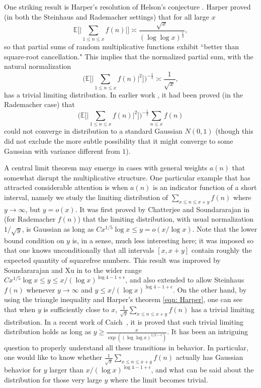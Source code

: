\documentclass[12pt, notitlepage]{amsart}
\numberwithin{equation}{section}
\def\E{\mathbb E}
\theoremstyle{remark}
\theoremstyle{definition}
\theoremstyle{remark}
\numberwithin{equation}{section}
\begin{document}
One striking result is Harper's resolution \cite{HarperLow} of Helson's conjecture \cite{Helson}.  Harper proved (in both the Steinhaus and Rademacher settings) that for all large $x$
 \begin{equation}\label{eqn: Harper}
  \E\Big[\Big|\sum_{1\le n \le x} f(n)\Big|\Big] \asymp \frac{\sqrt{x}}{(\log \log x)^{\frac 14}}, 
 \end{equation}
 so that partial sums of random multiplicative functions exhibit ``better than square-root cancellation."   This implies that the normalized partial sum, with the natural normalization 
 $$
 \Big(\E\Big[\Big|\sum_{1\le n \le x} f(n)\Big|^2\Big]\Big)^{-\frac 12}  \asymp \frac{1}{\sqrt{x}}, 
 $$
 has a trivial limiting distribution. In earlier work \cite{Harper}, it had been proved (in the Rademacher case) that 
 $$ 
 \Big(\E\Big[\Big|\sum_{1\le n \le x} f(n)\Big|^2\Big] \Big)^{-\frac 12} \sum_{n \leq x} f(n)
 $$ 
 could not converge in distribution to a standard Gaussian $N(0,1)$ (though this did not exclude the more subtle possibility that it might converge to some Gaussian with variance different from $1$).

 A central limit theorem may emerge in cases with general weights $a(n)$ that somewhat disrupt the multiplicative structure.  One particular example that has attracted considerable attention is when $a(n)$ is an indicator function of a short interval, namely we study the limiting distribution of $\sum_{x\le n \le x+y}f(n)$ where $y \rightarrow \infty$, but $y=o(x)$. It was first proved by Chatterjee and Soundararajan in \cite{CS} (for Rademacher $f(n)$) that the limiting distribution, with usual normalization $1/\sqrt
 {y}$, is Gaussian as long as $Cx^{1/5} \log x \leq y = o(x/\log x)$. Note that the lower bound condition on $y$ is, in a sense, much less interesting here; it was imposed so that one knows unconditionally that all intervals $[x, x+y]$ contain roughly the expected quantity of squarefree numbers. This result was improved by Soundararajan and Xu in \cite{SoundXu} to the wider range $Cx^{1/5} \log x \leq y\le x/(\log x)^{\log4-1 + \epsilon}$, and also extended to allow Steinhaus $f(n)$ whenever $y \rightarrow \infty$ and $y\le x/(\log x)^{\log4-1 + \epsilon}$. On the other hand, by using the triangle inequality and Harper's theorem \eqref{eqn: Harper}, one can see that when $y$ is sufficiently close to $x$, $\frac{1}{\sqrt{y}} \sum_{x\le n \le x+y}f(n)$ has a trivial limiting distribution. In a recent work of Caich~\cite{caichshort}, it is proved that such trivial limiting distribution holds as long as $y\ge \frac{x}{\exp((\log \log x)^{1/2-\epsilon})}$. It has been an intriguing question to properly understand all these transitions in behavior. In particular, one would like to know whether $\frac{1}{\sqrt{y}} \sum_{x\le n \le x+y}f(n)$ actually has Gaussian behavior for $y$ larger than $x/(\log x)^{\log4-1 + \epsilon}$, and what can be said about the distribution for those very large $y$ where the limit becomes trivial.
\end{document}
